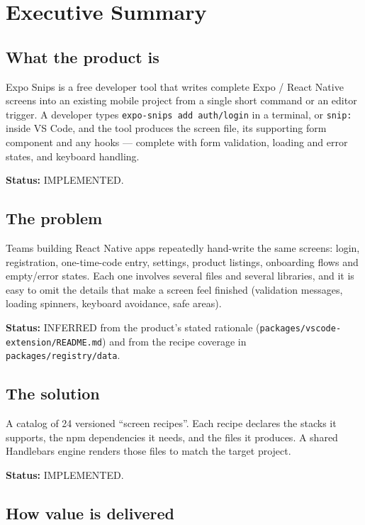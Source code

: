 \chapter{Executive Summary}
\label{ch:executive-summary}

\section{What the product is}

Expo Snips is a free developer tool that writes complete Expo / React Native
screens into an existing mobile project from a single short command or an editor
trigger. A developer types \texttt{expo-snips add auth/login} in a terminal, or
\texttt{snip:} inside VS Code, and the tool produces the screen file, its
supporting form component and any hooks --- complete with form validation,
loading and error states, and keyboard handling.

\textbf{Status:} IMPLEMENTED.

\section{The problem}

Teams building React Native apps repeatedly hand-write the same screens:
login, registration, one-time-code entry, settings, product listings, onboarding
flows and empty/error states. Each one involves several files and several
libraries, and it is easy to omit the details that make a screen feel finished
(validation messages, loading spinners, keyboard avoidance, safe areas).

\textbf{Status:} INFERRED from the product's stated rationale
(\texttt{packages/vscode-extension/README.md}) and from the recipe coverage in
\texttt{packages/registry/data}.

\section{The solution}

A catalog of 24 versioned ``screen recipes''. Each recipe declares the stacks it
supports, the npm dependencies it needs, and the files it produces. A shared
Handlebars engine renders those files to match the target project.

\textbf{Status:} IMPLEMENTED.

\section{How value is delivered}


